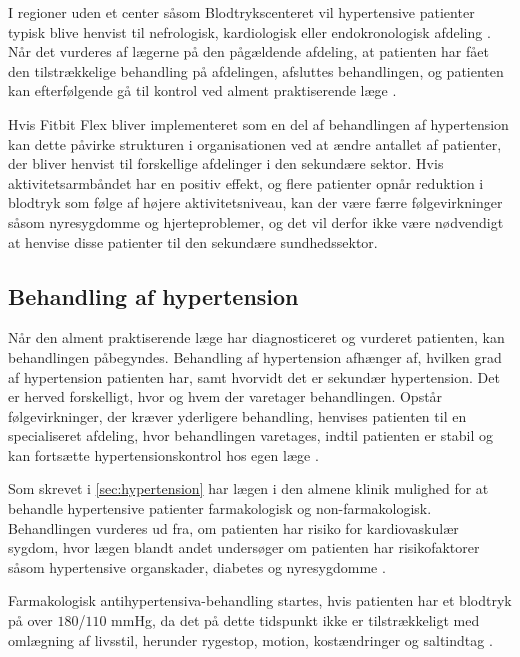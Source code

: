 I regioner uden et center såsom Blodtrykscenteret vil hypertensive patienter typisk blive henvist til nefrologisk, kardiologisk eller endokronologisk afdeling \citep{buur2011}. Når det vurderes af lægerne på den pågældende afdeling, at patienten har fået den tilstrækkelige behandling på afdelingen, afsluttes behandlingen, og patienten kan efterfølgende gå til kontrol ved alment praktiserende læge \citep{sundhedsstyrelsen2010, lodberg2016}.

Hvis Fitbit Flex bliver implementeret som en del af behandlingen af hypertension kan dette påvirke strukturen i organisationen ved at ændre antallet af patienter, der bliver henvist til forskellige afdelinger i den sekundære sektor. Hvis aktivitetsarmbåndet har en positiv effekt, og flere patienter opnår reduktion i blodtryk som følge af højere aktivitetsniveau, kan der være færre følgevirkninger såsom nyresygdomme og hjerteproblemer, og det vil derfor ikke være nødvendigt at henvise disse patienter til den sekundære sundhedssektor. 

\subsection{Behandling af hypertension}

Når den alment praktiserende læge har diagnosticeret og vurderet patienten, kan behandlingen påbegyndes. Behandling af hypertension afhænger af, hvilken grad af hypertension patienten har, samt hvorvidt det er sekundær hypertension. Det er herved forskelligt, hvor og hvem der varetager behandlingen. Opstår følgevirkninger, der kræver yderligere behandling, henvises patienten til en specialiseret afdeling, hvor behandlingen varetages, indtil patienten er stabil og kan fortsætte hypertensionskontrol hos egen læge \citep{sundhedsstyrelsen2010}.

Som skrevet i \autoref{sec:hypertension} har lægen i den almene klinik mulighed for at behandle hypertensive patienter farmakologisk og non-farmakologisk. Behandlingen vurderes ud fra, om patienten har risiko for kardiovaskulær sygdom, hvor lægen blandt andet undersøger om patienten har risikofaktorer såsom hypertensive organskader, diabetes og nyresygdomme \citep{promedicin2016}.

Farmakologisk antihypertensiva-behandling startes, hvis patienten har et blodtryk på over $180$/$110$ mmHg, da det på dette tidspunkt ikke er tilstrækkeligt med omlægning af livsstil, herunder rygestop, motion, kostændringer og saltindtag \citep{pedersen2016, bech2015}. 


